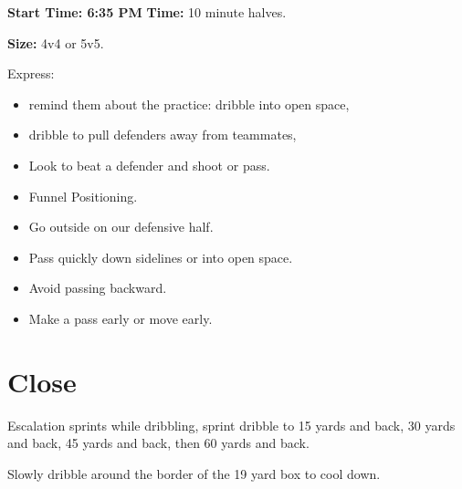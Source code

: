 \documentclass[10pt,letterpaper]{article}
\newenvironment{oddBlock}[1]{%
    \tcolorbox[beamer,%
    noparskip,breakable,
    colback=LightBlue,colframe=DarkBlue,%
    colbacklower=DarkBlue!75!LightBlue,%
    title=#1]}%
    {\endtcolorbox}
\begin{document}
\begin{oddBlock}{Small Sided}
    \textbf{Start Time: 6:35 PM}
    \textbf{Time:} 10 minute halves.

    \textbf{Size:} 4v4 or 5v5.

    Express:
    \begin{itemize}
        \setlength{\itemsep}{0pt}
        \setlength{\parskip}{0pt}
        \setlength{\parsep}{0pt}
        \item  remind them about the practice: dribble into open space,
        \item dribble to pull defenders away from teammates,
        \item Look to beat a defender and shoot or pass.
        \item Funnel Positioning.
        \item Go outside on our defensive half.
        \item Pass quickly down sidelines or into open space.
        \item Avoid passing backward.
        \item Make a pass early or move early.
    \end{itemize}

\end{oddBlock}

\section{Close}
\begin{oddBlock}{Sprints}
    Escalation sprints while dribbling, sprint dribble to 15 yards and back, 30 yards and back, 45 yards and back, then 60 yards and back.

    \vspace{12pt}
    
    Slowly dribble around the border of the 19 yard box to cool down.

\end{oddBlock}
\end{document}
